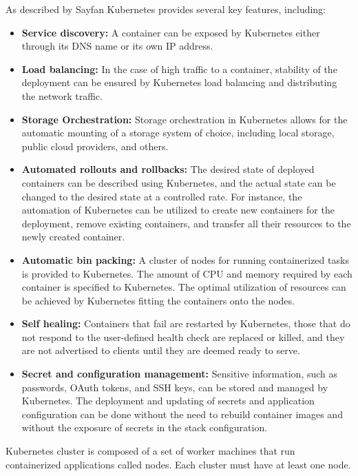 As described by Sayfan \cite{Sayfan2020} Kubernetes provides several key features, including:
\begin{itemize}
\item \textbf{Service discovery:} A container can be exposed by Kubernetes either through its DNS name or its own IP address.
\item \textbf{Load balancing:} In the case of high traffic to a container, stability of the deployment can be ensured by Kubernetes load balancing and distributing the network traffic.
\item \textbf{Storage Orchestration:} Storage orchestration in Kubernetes allows for the automatic mounting of a storage system of choice, including local storage, public cloud providers, and others. 
\item \textbf{Automated rollouts and rollbacks:} The desired state of deployed containers can be described using Kubernetes, and the actual state can be changed to the desired state at a controlled rate. For instance, the automation of Kubernetes can be utilized to create new containers for the deployment, remove existing containers, and transfer all their resources to the newly created container.
\item \textbf{Automatic bin packing:} A cluster of nodes for running containerized tasks is provided to Kubernetes. The amount of CPU and memory required by each container is specified to Kubernetes. The optimal utilization of resources can be achieved by Kubernetes fitting the containers onto the nodes.
\item \textbf{Self healing:} Containers that fail are restarted by Kubernetes, those that do not respond to the user-defined health check are replaced or killed, and they are not advertised to clients until they are deemed ready to serve.
\item \textbf{Secret and configuration management:} Sensitive information, such as passwords, OAuth tokens, and SSH keys, can be stored and managed by Kubernetes. The deployment and updating of secrets and application configuration can be done without the need to rebuild container images and without the exposure of secrets in the stack configuration.
\end{itemize}
Kubernetes cluster is composed of a set of worker machines that run containerized applications called nodes. Each cluster must have at least one node. \cite{kubedocu2022}

